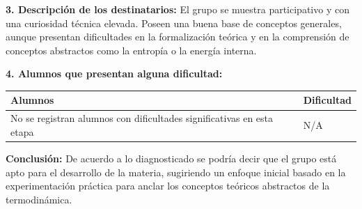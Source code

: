 \documentclass[11pt, a4paper]{article}
\begin{document}
\noindent \textbf{3. Descripción de los destinatarios:}
El grupo se muestra participativo y con una curiosidad técnica elevada. Poseen una buena base de conceptos generales, aunque presentan dificultades en la formalización teórica y en la comprensión de conceptos abstractos como la entropía o la energía interna.

\noindent \textbf{4. Alumnos que presentan alguna dificultad:}

\begin{tabular}{|p{}|p{}|}
\hline
\rowcolor{gray!20} \textbf{Alumnos} & \textbf{Dificultad} \\
\hline
No se registran alumnos con dificultades significativas en esta etapa & N/A \\
\hline
\end{tabular}

\vspace{2em}

\noindent \textbf{Conclusión:}
De acuerdo a lo diagnosticado se podría decir que el grupo está apto para el desarrollo de la materia, sugiriendo un enfoque inicial basado en la experimentación práctica para anclar los conceptos teóricos abstractos de la termodinámica.
\end{document}
